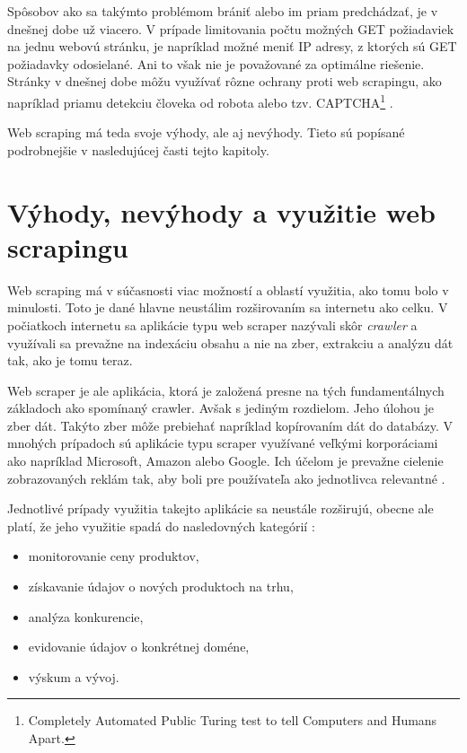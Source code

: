 Spôsobov ako sa takýmto problémom brániť alebo im priam predchádzať, je v dnešnej dobe už viacero. V prípade limitovania počtu možných GET požiadaviek na jednu webovú stránku, je napríklad možné meniť IP adresy, z ktorých sú GET požiadavky odosielané. Ani to však nie je považované za optimálne riešenie. Stránky v dnešnej dobe môžu využívať rôzne ochrany proti web scrapingu, ako napríklad priamu detekciu človeka od robota alebo tzv. CAPTCHA\footnote{Completely Automated Public Turing test to tell Computers and Humans Apart.} \cite{JanCurna:online}.

Web scraping má teda svoje výhody, ale aj nevýhody. Tieto sú popísané podrobnejšie v nasledujúcej časti tejto kapitoly.

\section{Výhody, nevýhody a využitie web scrapingu}

Web scraping má v súčasnosti viac možností a oblastí využitia, ako tomu bolo v minulosti. Toto je dané hlavne neustálim rozširovaním sa internetu ako celku. V počiatkoch internetu sa aplikácie typu web scraper nazývali skôr \textit{crawler} a využívali sa prevažne na indexáciu obsahu a nie na zber, extrakciu a analýzu dát tak, ako je tomu teraz. 

Web scraper je ale aplikácia, ktorá je založená presne na tých fundamentálnych základoch ako spomínaný crawler. Avšak s jediným rozdielom. Jeho úlohou je zber dát. Takýto zber môže prebiehať napríklad kopírovaním dát do databázy. V mnohých prípadoch sú aplikácie typu scraper využívané veľkými korporáciami ako napríklad Microsoft, Amazon alebo Google. Ich účelom je prevažne cielenie zobrazovaných reklám tak, aby boli pre používateľa ako jednotlivca relevantné \cite{online:how_does_scraping_work}.

\bigskip

Jednotlivé prípady využitia takejto aplikácie sa neustále rozširujú, obecne ale platí, že jeho využitie spadá do nasledovných kategórií \cite{WebScrap}:

\begin{itemize}
    \item monitorovanie ceny produktov,
    \item získavanie údajov o nových produktoch na trhu,
    \item analýza konkurencie,
    \item evidovanie údajov o konkrétnej doméne,
    \item výskum a vývoj.
\end{itemize}

